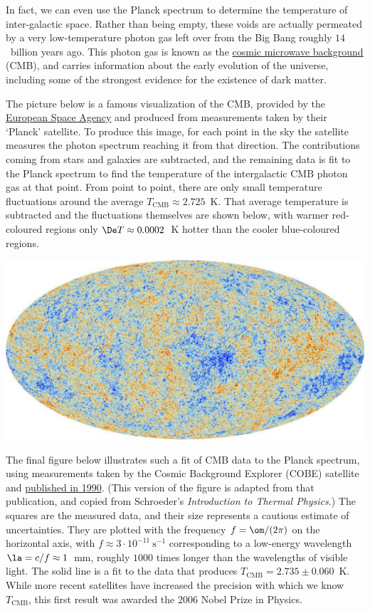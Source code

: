 In fact, we can even use the Planck spectrum to determine the temperature of inter-galactic space.
Rather than being empty, these voids are actually permeated by a very low-temperature photon gas left over from the Big Bang roughly $14$~billion years ago.
This photon gas is known as the \href{https://en.wikipedia.org/wiki/Cosmic_microwave_background}{cosmic microwave background} (CMB), and carries information about the early evolution of the universe, including some of the strongest evidence for the existence of dark matter.

The picture below is a famous visualization of the CMB, provided by the \href{http://www.esa.int/ESA_Multimedia/Images/2013/03/Planck_CMB}{European Space Agency} and produced from measurements taken by their `Planck' satellite. %
To produce this image, for each point in the sky the satellite measures the photon spectrum reaching it from that direction.
The contributions coming from stars and galaxies are subtracted, and the remaining data is fit to the Planck spectrum to find the temperature of the intergalactic CMB photon gas at that point.
From point to point, there are only small temperature fluctuations around the average $T_{\text{CMB}} \approx 2.725$~K.
That average temperature is subtracted and the fluctuations themselves are shown below, with warmer red-coloured regions only $\De T \approx 0.0002$~K hotter than the cooler blue-coloured regions.

\begin{center}\includegraphics[width=\textwidth]{figs/unit08_CMB.pdf}\end{center}

The final figure below illustrates such a fit of CMB data to the Planck spectrum, using measurements taken by the Cosmic Background Explorer (COBE) satellite and \href{https://doi.org/10.1086/185717}{published in 1990}.
(This version of the figure is adapted from that publication, and copied from Schroeder's \textit{Introduction to Thermal Physics}.)
The squares are the measured data, and their size represents a cautious estimate of uncertainties.
They are plotted with the frequency $f = \om / (2\pi)$ on the horizontal axis, with $f \approx 3\cdot 10^{-11}~\text{s}^{-1}$ corresponding to a low-energy wavelength $\la = c / f \approx 1$~mm, roughly $1000$ times longer than the wavelengths of visible light.
The solid line is a fit to the data that produces $T_{\text{CMB}} = 2.735 \pm 0.060$~K.
While more recent satellites have increased the precision with which we know $T_{\text{CMB}}$, this first result was awarded the 2006 Nobel Prize in Physics.

